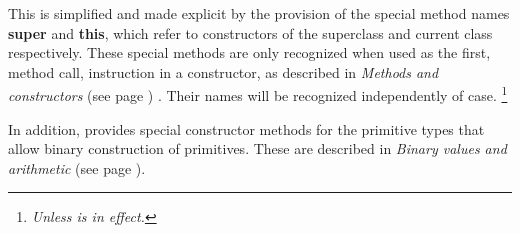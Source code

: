 This is simplified and made explicit by the provision of the special
method names \textbf{super} and \textbf{this}, which refer to
constructors of the superclass and current class respectively.  These
special methods are only recognized when used as the first, method call,
instruction in a constructor, as described in
 \emph{Methods and constructors} (see page \pageref{refmethcon}) .
Their names will be recognized independently of case.
\footnote{
\emph{Unless  is in effect.
}
}
 
In addition, \nr{} provides special constructor methods for the
primitive types that allow binary construction of primitives.
These are described in  \emph{Binary values and arithmetic} (see page \pageref{refbincon}).
